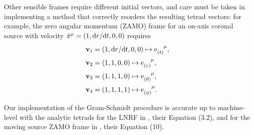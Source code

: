 Other sensible frames require different initial vectors, and care must be taken in implementing a method that correctly reorders the resulting tetrad vectors: for example, the zero angular momentum (ZAMO) frame for an on-axis coronal source with velocity $\dot{x}^\mu = (1, \text{d} r / \text{d} t, 0, 0)$ requires
\begin{align}
    \vector{v}_1 &= \left(1, \d r / \d t, 0, 0 \right) \mapsto \dtensor{\e}{(t)}{\mu}, \nonumber \\
    \vector{v}_2 &= \left(1, 1, 0, 0\right) \mapsto \dtensor{\e}{(r)}{\mu}, \nonumber \\
    \vector{v}_3 &= \left(1, 1, 1, 0\right) \mapsto \dtensor{\e}{(\theta)}{\mu}, \nonumber \\
    \vector{v}_4 &= \left(1, 1, 1, 1\right) \mapsto \dtensor{\e}{(\phi)}{\mu}.
\end{align}

Our implementation of the Gram-Schmidt procedure is accurate up to machine-level with the analytic tetrads for the LNRF in \cite{bardeen_rotating_1972}, their Equation (3.2), and for the moving source ZAMO frame in \cite{gonzalez_probing_2017}, their Equation (10).
